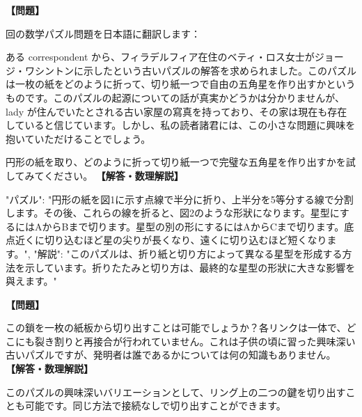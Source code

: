 \documentclass[10pt,a4paper,oneside,openany]{ltjsbook}
\begin{document}
\begin{tcolorbox}[colback=softblue,colframe=primaryblue,title=\textbf{第 161 問：THE BETSY ROSS PUZZLE.},arc=2mm,boxrule=1pt,breakable]
\textbf{【問題】}\par\vspace{0.3em}
回の数学パズル問題を日本語に翻訳します：

ある correspondent から、フィラデルフィア在住のベティ・ロス女士がジョージ・ワシントンに示したという古いパズルの解答を求められました。このパズルは一枚の紙をどのように折って、切り紙一つで自由の五角星を作り出すかというものです。このパズルの起源についての話が真実かどうかは分かりませんが、 lady が住んでいたとされる古い家屋の寫真を持っており、その家は現在も存在していると信じています。しかし、私の読者諸君には、この小さな問題に興味を抱いていただけることでしょう。

円形の紙を取り、どのように折って切り紙一つで完璧な五角星を作り出すかを試してみてください。
\tcblower
\textbf{【解答・数理解説】}\par\vspace{0.3em}
{
"パズル": "円形の紙を図1に示す点線で半分に折り、上半分を5等分する線で分割します。その後、これらの線を折ると、図2のような形狀になります。星型にするにはAからBまで切ります。星型の別の形にするにはAからCまで切ります。底点近くに切り込むほど星の尖りが長くなり、遠くに切り込むほど短くなります。",
"解説": "このパズルは、折り紙と切り方によって異なる星型を形成する方法を示しています。折りたたみと切り方は、最終的な星型の形狀に大きな影響を與えます。"
}
\end{tcolorbox}

\begin{tcolorbox}[colback=softblue,colframe=primaryblue,title=\textbf{第 162 問：紙板の鎖 （原題: THE CARDBOARD CHAIN.）},arc=2mm,boxrule=1pt,breakable]
\textbf{【問題】}\par\vspace{0.3em}
この鎖を一枚の紙板から切り出すことは可能でしょうか？各リンクは一体で、どこにも裂き割りと再接合が行われていません。これは子供の頃に習った興味深い古いパズルですが、発明者は誰であるかについては何の知識もありません。
\tcblower
\textbf{【解答・数理解説】}\par\vspace{0.3em}
このパズルの興味深いバリエーションとして、リング上の二つの鍵を切り出すことも可能です。同じ方法で接続なしで切り出すことができます。
\end{tcolorbox}
\end{document}
